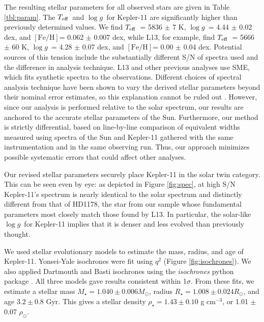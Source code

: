\documentclass[twocolumn,trackchanges]{aastex61}
\newcommand{\teff}{$T_{\rm eff}$}
\newcommand{\logg}{$\log g$}
\newcommand{\feh}{$\mathrm{[Fe/H]}$}
\newcommand{\gcm}{g cm$^{-3}$}
\begin{document}
The resulting stellar parameters for all observed stars are given in Table \ref{tbl:param}. The \teff\ and \logg\ for Kepler-11 are significantly higher than previously determined values. We find \teff\ = 5836 $\pm$ 7 K, \logg\ = 4.44 $\pm$ 0.02 dex, and \feh = 0.062 $\pm$ 0.007 dex, while L13, for example, find \teff\ = 5666 $\pm$ 60 K, \logg\ = 4.28 $\pm$ 0.07 dex, and \feh = 0.00 $\pm$ 0.04 dex. Potential sources of this tension include the substantially different S/N of spectra used and the difference in analysis technique. L13 and other previous analyses use SME, which fits synthetic spectra to the observations. Different choices of spectral analysis technique have been shown to vary the derived stellar parameters beyond their nominal error estimates, so this explanation cannot be ruled out \citep{Hinkel2016}. However, since our analysis is performed relative to the solar spectrum, our results are anchored to the accurate stellar parameters of the Sun. Furthermore, our method is strictly differential, based on line-by-line comparison of equivalent widths measured using spectra of the Sun and Kepler-11 gathered with the same instrumentation and in the same observing run. Thus, our approach minimizes possible systematic errors that could affect other analyses.

Our revised stellar parameters securely place Kepler-11 in the solar twin category. This can be seen even by eye: as depicted in Figure \ref{fig:spec}, at high S/N Kepler-11's spectrum is nearly identical to the solar spectrum and distinctly different from that of HD1178, the star from our sample whose fundamental parameters most closely match those found by L13. In particular, the solar-like \logg\ for Kepler-11 implies that it is denser and less evolved than previously thought.

We used stellar evolutionary models to estimate the mass, radius, and age of Kepler-11. Yonsei-Yale isochrones were fit using $q^2$ (Figure \ref{fig:isochrones}). We also applied Dartmouth and Basti isochrones using the \textit{isochrones} python package \citep{Morton2015}. All three models gave results consistent within 1$\sigma$. From these fits, we estimate a stellar mass $M_{\star} = 1.040 \pm 0.006 M_{\odot}$, radius $R_{\star} = 1.008 \pm 0.024 R_{\odot}$, and age $3.2 \pm 0.8$ Gyr. This gives a stellar density $\rho_{\star} = 1.43 \pm 0.10$ \gcm, or 1.01 $\pm$ 0.07 $\rho_{\odot}$.  %
\end{document}
